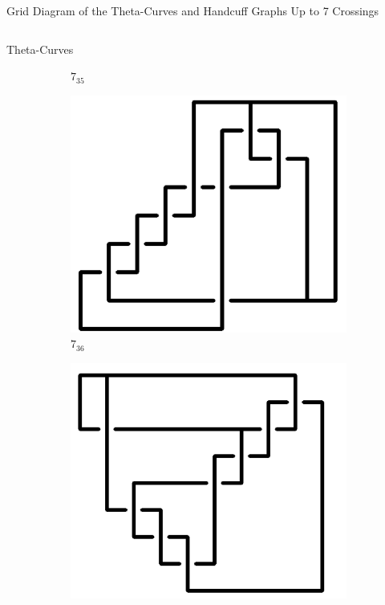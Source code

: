 \documentclass[final]{beamer}
\begin{document}
\begin{frame}[t]
\begin{alertblock}{Grid Diagram of the Theta-Curves and Handcuff Graphs Up to 7 Crossings}
\begin{columns}[t]
\begin{column}{0.5\textwidth}
\begin{alertblock}{Theta-Curves}
\begin{figure}
\begin{subfigure}{0.075\textwidth}
    \caption{$7_{35}$} 
    \end{subfigure}
    \begin{subfigure}{0.075\textwidth}
    \includegraphics[width=\columnwidth]{../Midterm_Poster/grid_diagram/theta_7_36.png}
    \caption{$7_{36}$} 
    \end{subfigure}
    \begin{subfigure}{0.075\textwidth}
    \includegraphics[width=\columnwidth]{../Midterm_Poster/grid_diagram/theta_7_37.png}

\end{subfigure}
\end{figure}
\end{alertblock}
\end{column}
\end{columns}
\end{alertblock}
\end{frame}
\end{document}
